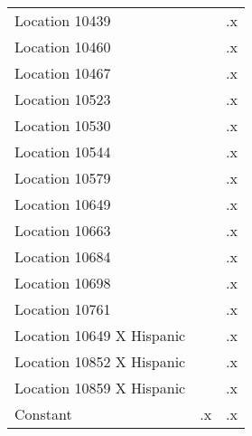 \begin{tabular}{l*{2}{c}}
Location 10439      &            &          .x\\
Location 10460      &            &          .x\\
Location 10467      &            &          .x\\
Location 10523      &            &          .x\\
Location 10530      &            &          .x\\
Location 10544      &            &          .x\\
Location 10579      &            &          .x\\
Location 10649      &            &          .x\\
Location 10663      &            &          .x\\
Location 10684      &            &          .x\\
Location 10698      &            &          .x\\
Location 10761      &            &          .x\\
Location 10649 X Hispanic&            &          .x\\
Location 10852 X Hispanic&            &          .x\\
Location 10859 X Hispanic&            &          .x\\
Constant            &          .x&          .x\\
\hline\hline
\end{tabular}
